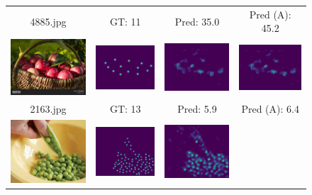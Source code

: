 \begin{figure}[htb]
\begin{tabular}{cccc}
		4885.jpg & GT: 11 & Pred: 35.0 & Pred (A): 45.2 \\
		\includegraphics[width=0.24\linewidth]{fig/2163_img.png} &
		\includegraphics[width=0.24\linewidth]{fig/2163_gt.png} &
		\includegraphics[width=0.24\linewidth]{fig/2163_pred.png} &
		\includegraphics[width=0.24\linewidth]{fig/2163_pred_adapt.png} \\
		2163.jpg & GT: 13 & Pred: 5.9 & Pred (A): 6.4 \\
		\includegraphics[width=0.24\linewidth]{fig/4300_img.png} &
		\includegraphics[width=0.24\linewidth]{fig/4300_gt.png} &
		\includegraphics[width=0.24\linewidth]{fig/4300_pred.png} &

\end{tabular}
\end{figure}
